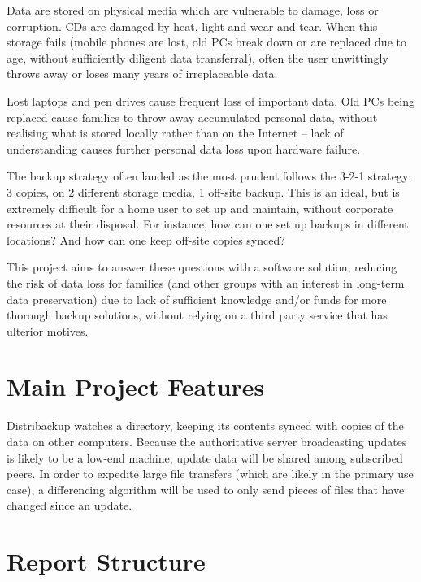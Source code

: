 \documentclass[12pt,a4paper,]{adreport}
\begin{document}
Data are stored on physical media which are vulnerable to damage, loss
or corruption. CDs are damaged by heat, light and wear and tear. When
this storage fails (mobile phones are lost, old PCs break down or are
replaced due to age, without sufficiently diligent data transferral),
often the user unwittingly throws away or loses many years of
irreplaceable data.

Lost laptops and pen drives cause frequent loss of important data. Old
PCs being replaced cause families to throw away accumulated personal
data, without realising what is stored locally rather than on the
Internet -- lack of understanding causes further personal data loss upon
hardware failure.

The backup strategy often lauded as the most prudent follows the 3-2-1
strategy: 3 copies, on 2 different storage media, 1 off-site
backup.\cite{Backups with the 3-2-1 rule} This is an ideal, but is extremely difficult
for a home user to set up and maintain, without corporate resources at
their disposal. For instance, how can one set up backups in different
locations? And how can one keep off-site copies synced?

This project aims to answer these questions with a software solution,
reducing the risk of data loss for families (and other groups with an
interest in long-term data preservation) due to lack of sufficient
knowledge and/or funds for more thorough backup solutions, without
relying on a third party service that has ulterior motives.

\section{Main Project Features}\label{main-project-features}

Distribackup watches a directory, keeping its contents synced with
copies of the data on other computers. Because the authoritative server
broadcasting updates is likely to be a low-end machine, update data will
be shared among subscribed peers. In order to expedite large file
transfers (which are likely in the primary use case), a differencing
algorithm will be used to only send pieces of files that have changed
since an update.

\section{Report Structure}
\end{document}
